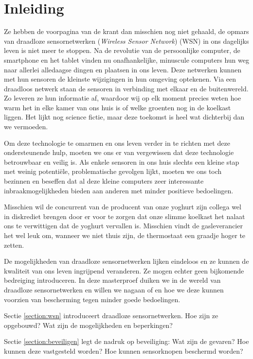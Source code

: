 
\chapter{Inleiding}
\label{inleiding}

Ze hebben de voorpagina van de krant dan misschien nog niet gehaald, de opmars
van draadloze sensornetwerken (\emph{Wireless Sensor Network}) (WSN) in ons
dagelijks leven is niet meer te stoppen. Na de revolutie van de persoonlijke
computer, de smartphone en het tablet vinden nu onafhankelijke, minuscule
computers hun weg naar allerlei alledaagse dingen en plaatsen in ons leven.
Deze netwerken kunnen met hun sensoren de kleinste wijzigingen in hun omgeving
optekenen. Via een draadloos netwerk staan de sensoren in verbinding met elkaar
en de buitenwereld. Zo leveren ze hun informatie af, waardoor wij op elk moment
precies weten hoe warm het in elke kamer van ons huis is of welke groenten nog
in de koelkast liggen. Het lijkt nog science fictie, maar deze toekomst is heel
wat dichterbij dan we vermoeden.

Om deze technologie te omarmen en ons leven verder in te richten met deze
ondersteunende hulp, moeten we ons er van vergewissen dat deze technologie
betrouwbaar en veilig is. Als enkele sensoren in ons huis slechts een kleine
stap met weinig potenti\"ele, problematische gevolgen lijkt, moeten we ons toch
bezinnen en beseffen dat al deze kleine computers zeer interessante
inbraakmogelijkheden bieden aan anderen met minder positieve bedoelingen.

Misschien wil de concurrent van de producent van onze yoghurt zijn collega wel
in diskrediet brengen door er voor te zorgen dat onze slimme koelkast het
nalaat ons te verwittigen dat de yoghurt vervallen is. Misschien vindt de
gasleverancier het wel leuk om, wanneer we niet thuis zijn, de thermostaat een
graadje hoger te zetten.

De mogelijkheden van draadloze sensornetwerken lijken eindeloos en ze kunnen de
kwaliteit van ons leven ingrijpend veranderen. Ze mogen echter geen bijkomende
bedreiging introduceren. In deze masterproef duiken we in de wereld van
draadloze sensornetwerken en willen we nagaan of en hoe we deze kunnen voorzien
van bescherming tegen minder goede bedoelingen.

Sectie \ref{section:wsn} introduceert draadloze sensornetwerken. Hoe zijn ze
opgebouwd? Wat zijn de mogelijkheden en beperkingen? 

Sectie \ref{section:beveiligen} legt de nadruk op beveiliging: Wat zijn de
gevaren? Hoe kunnen deze vastgesteld worden? Hoe kunnen sensorknopen beschermd
worden?

